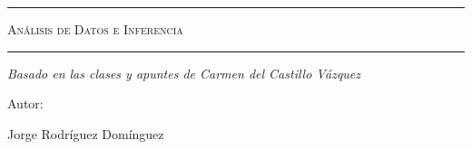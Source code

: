 \begin{titlepage}
\centering
{\bfseries\LARGE \ \par}
\vspace{1cm}
{\scshape\Large \ \par}
\vspace{3cm}
\rule{\linewidth}{0.5mm}
{\scshape\Huge Análisis de Datos e Inferencia\par}
\rule{\linewidth}{0.5mm} \par
\vspace{3cm}
{\itshape\Large Basado en las clases y apuntes de Carmen del Castillo Vázquez \par}
\vfill
\begin{figure}[H]
    \centering
\end{figure}
{\Large Autor: \par}
{\Large Jorge Rodríguez Domínguez \par}
\vfill
\end{titlepage}
\tableofcontents